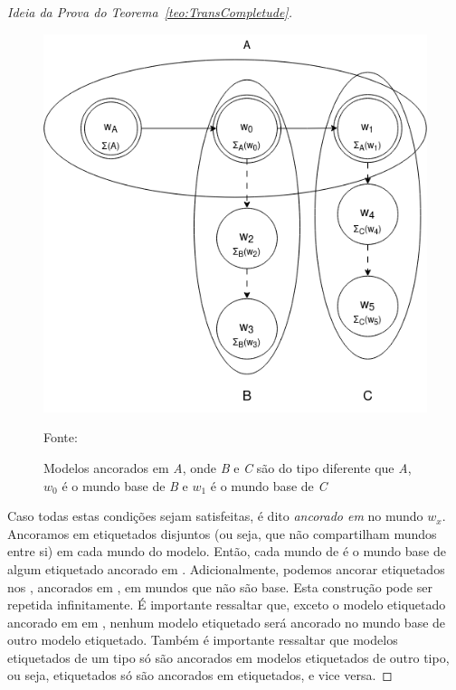 \begin{proof}[Ideia da Prova do Teorema~\ref{teo:TransCompletude}]
                \begin{figure}[htbp]
                    \centering
                    \includegraphics[scale=.5]{Figuras/MultiplosModelos.png}
                    \caption[Modelos Ancorados]{Modelos ancorados em \textit{A}, onde \textit{B} e \textit{C} são do tipo diferente que \textit{A},
                    \(w_0\) é o mundo base de \textit{B} e \(w_1\) é o mundo base de \textit{C}}
                    \small{Fonte: \me}
                    \label{fig:ModelosAncorados}
                \end{figure}

                Caso todas estas condições sejam satisfeitas,  é dito \textit{ancorado em} \Modeloinicial no mundo \(w_x\). Ancoramos em \Modeloinicial \OPImodelos etiquetados
                disjuntos (ou seja, que não compartilham mundos entre si) em cada mundo do modelo. Então, cada mundo de \Modeloinicial é o mundo base de algum
                \OPImodelo etiquetado ancorado em \Modeloinicial. Adicionalmente, podemos ancorar \PImodelos etiquetados nos \OPImodelos, ancorados em \Modeloinicial, em mundos que não são base.
                Esta construção pode ser repetida infinitamente. É importante ressaltar que, exceto o modelo etiquetado ancorado em \Mundoinicial em \Modeloinicial,
                nenhum modelo etiquetado será ancorado no mundo base de outro modelo etiquetado. Também é importante ressaltar que modelos etiquetados de um tipo só são ancorados em
                modelos etiquetados de outro tipo, ou seja, \PImodelos etiquetados só são ancorados em \OPImodelos etiquetados, e vice versa.


\end{proof}
